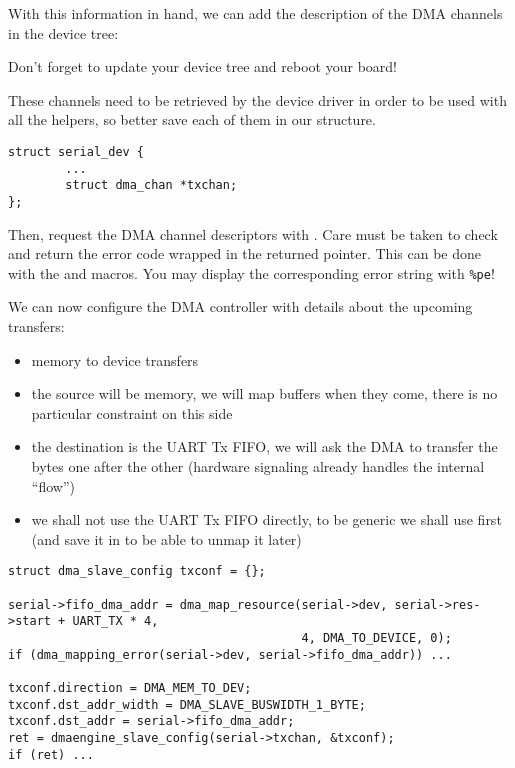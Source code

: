 With this information in hand, we can add the description of the DMA channels in
the device tree:


Don't forget to update your device tree and reboot your board!

These channels need to be retrieved by the device driver in order to be used
with all the  helpers, so better save each of them in
our  structure.

\begin{verbatim}
struct serial_dev {
        ...
        struct dma_chan *txchan;
};
\end{verbatim}

Then, request the DMA channel descriptors with . Care
must be taken to check and return the error code wrapped in the
returned  pointer. This can be done with the 
and  macros. You may display the corresponding error string with
{\tt \%pe}!

We can now configure the DMA controller with details about the upcoming
transfers:
\begin{itemize}
\item memory to device transfers
\item the source will be memory, we will map buffers when they come,
  there is no particular constraint on this side
\item the destination is the UART Tx FIFO, we will ask the DMA to
  transfer the bytes one after the other (hardware signaling already
  handles the internal ``flow'')
\item we shall not use the UART Tx FIFO directly, to be generic we shall use
   first (and save it in  to be able
  to unmap it later)
\end{itemize}

\begin{verbatim}
struct dma_slave_config txconf = {};

serial->fifo_dma_addr = dma_map_resource(serial->dev, serial->res->start + UART_TX * 4,
                                         4, DMA_TO_DEVICE, 0);
if (dma_mapping_error(serial->dev, serial->fifo_dma_addr)) ...

txconf.direction = DMA_MEM_TO_DEV;
txconf.dst_addr_width = DMA_SLAVE_BUSWIDTH_1_BYTE;
txconf.dst_addr = serial->fifo_dma_addr;
ret = dmaengine_slave_config(serial->txchan, &txconf);
if (ret) ...
\end{verbatim}

